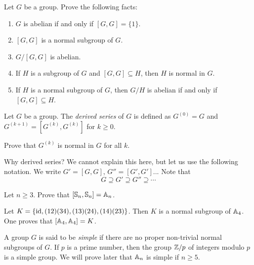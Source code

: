 \begin{exercise}
    Let $G$ be a group. 
    Prove the following facts:
    \begin{enumerate}
        \item $G$ is abelian if and only if $[G,G]=\{1\}$.
        \item $[G,G]$ is a normal subgroup of $G$. 
        \item $G/[G,G]$ is abelian. 
        \item If $H$ is a subgroup of $G$ and $[G,G]\subseteq H$, then 
        $H$ is normal in $G$.
        \item If $H$ is a normal subgroup of $G$, then 
        $G/H$ is abelian if and only if $[G,G]\subseteq H$. 
    \end{enumerate}
\end{exercise}

\begin{definition}
    Let $G$ be a group. The \emph{derived series} of $G$ 
    is defined as $G^{(0)}=G$ and
    $G^{(k+1)}=[G^{(k)},G^{(k)}]$ for $k\geq 0$. 
\end{definition}

\begin{exercise}
    Prove that $G^{(k)}$ is normal in $G$ for all $k$. 
\end{exercise}

Why derived series? We cannot explain this here, but let us use the following
notation. 
We write $G'=[G,G]$, $G''=[G',G']$... 
Note that 
\[
G\supseteq G'\supseteq G''\supseteq\cdots
\]


\begin{exercise}
    Let $n\geq3$. Prove that 
    $[\mathbb{S}_n,\mathbb{S}_n]=\mathbb{A}_n$. 
\end{exercise}

\begin{example}
    Let $K=\{\operatorname{id},(12)(34),(13)(24),(14)(23)\}$. Then 
    $K$ is a normal subgroup of $\mathbb{A}_4$. 
    One proves that $[\mathbb{A}_4,\mathbb{A}_4]=K$. 
\end{example}

A group $G$ is said to be \emph{simple} 
if there are no proper non-trivial normal subgroups of $G$. If $p$
is a prime number, then the group 
$\mathbb{Z}/p$ of integers modulo $p$ 
is a simple group. We will prove
later that $\mathbb{A}_n$ is simple if 
$n\geq5$. 


